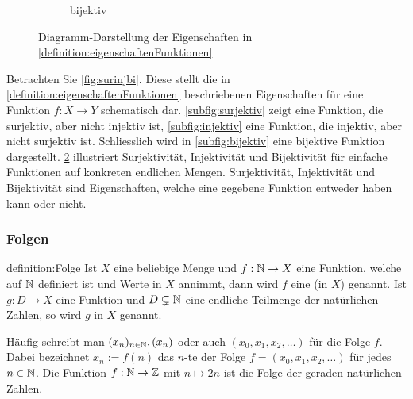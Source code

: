 \begin{figure}[H]
\begin{subfigure}[b]{0.30\textwidth}
        \caption{bijektiv}
        \label{subfig:bijektivDiagramm}
    \end{subfigure}
    \caption{Diagramm-Darstellung der Eigenschaften in \cref{definition:eigenschaftenFunktionen}}
    \label{fig:diagsurinjbi}
\end{figure} 

\noindent
Betrachten Sie \cref{fig:surinjbi}. Diese stellt die in \cref{definition:eigenschaftenFunktionen} beschriebenen Eigenschaften für eine Funktion $f:X\to Y$ schematisch dar. \cref{subfig:surjektiv} zeigt eine Funktion, die surjektiv, aber nicht injektiv ist, \cref{subfig:injektiv} eine Funktion, die injektiv, aber nicht surjektiv ist. Schliesslich wird in \cref{subfig:bijektiv} eine bijektive Funktion dargestellt. \cref{fig:diagsurinjbi} illustriert Surjektivität, Injektivität und Bijektivität für einfache Funktionen auf konkreten endlichen Mengen. Surjektivität, Injektivität und Bijektivität sind Eigenschaften, welche eine gegebene Funktion entweder haben kann oder nicht.

\subsubsection{Folgen}
\begin{definition}[Folge]{definition:Folge}
    Ist $X$ eine beliebige Menge und $f:\mathbb{N}\to X$ eine Funktion, welche auf $\mathbb{N}$ definiert ist und Werte in $X$ annimmt, dann wird $f$ eine  (in $X$) genannt. Ist $g:D\to X$ eine Funktion und $D\subsetneq\mathbb{N}$ eine endliche Teilmenge der natürlichen Zahlen, so wird $g$  in $X$ genannt.
\end{definition}
Häufig schreibt man $(x_n)_{n\in\mathbb{N}}, (x_n)$ oder auch $(x_0,x_1,x_2,\dots)$ für die Folge $f$. Dabei bezeichnet $x_n := f(n)$ das $n$-te  der Folge $f = (x_0,x_1,x_2,\dots)$ für jedes $n\in\mathbb{N}$. 
\beispiel{-}
{Die Funktion $f:\mathbb{N}\to\mathbb{Z}$ mit $n\mapsto 2n$ ist die Folge der geraden natürlichen Zahlen.} 

